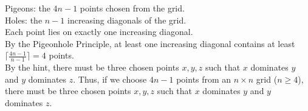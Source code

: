 \documentclass[12pt]{exam}
\begin{document}
\begin{solution}
	Pigeons: the $4n-1$ points chosen from the grid.\\
	Holes: the $n-1$ increasing diagonals of the grid.\\
	Each point lies on exactly one increasing diagonal.\\
	By the Pigeonhole Principle, at least one increasing diagonal contains at least $\lceil \frac{4n-1}{n-1} \rceil = 4$ points.\\
	By the hint, there must be three chosen points $x, y, z$ such that $x$ dominates $y$ and $y$ dominates $z$.
	Thus, if we choose $4n-1$ points from an $n \times n$ grid ($n\ge 4$), there must be three chosen points $x, y, z$ such that $x$ dominates $y$ and $y$ dominates $z$.
\end{solution}
\end{document}
